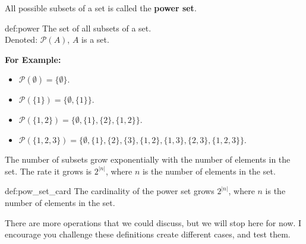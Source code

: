 \noindent
All possible subsets of a set is called the \textbf{power set}.
\begin{Def}{def:power}
    The set of all subsets of a set.\\
    Denoted: $\mathcal{P}(A)$, $A$ is a set.
\end{Def}

\noindent
\textbf{For Example:}
\begin{itemize}
    \item $\mathcal{P}(\emptyset) = \{\emptyset\}$.
    \item $\mathcal{P}(\{1\}) = \{\emptyset, \{1\}\}$.
    \item $\mathcal{P}(\{1, 2\}) = \{\emptyset, \{1\}, \{2\}, \{1, 2\}\}$.
    \item $\mathcal{P}(\{1, 2, 3\}) = \{\emptyset, \{1\}, \{2\}, \{3\}, \{1, 2\}, \{1, 3\}, \{2, 3\}, \{1, 2, 3\}\}$.
\end{itemize}

\noindent
The number of subsets grow exponentially with the number of elements in the set.
The rate it grows is $2^{|n|}$, where $n$ is the number of elements in the set.

\begin{Def}{def:pow_set_card}
    The cardinality of the power set grows $2^{|n|}$, where $n$ is the number of elements in the set.
\end{Def}

\newpage

\noindent
There are more operations that we could discuss, but we will stop here for now.
I encourage you challenge these definitions create different cases, and test them.\\
